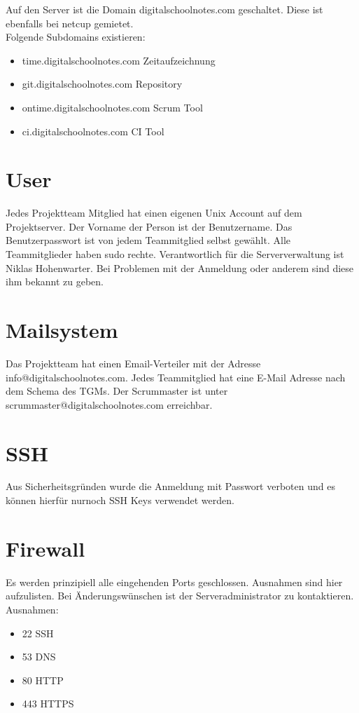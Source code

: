 \documentclass[12pt,a4paper,oneside,ngerman]{scrartcl}
\begin{document}
Auf den Server ist die Domain digitalschoolnotes.com geschaltet. Diese ist ebenfalls bei netcup gemietet.\\

Folgende Subdomains existieren:

\begin{itemize}
\item time.digitalschoolnotes.com \hfill Zeitaufzeichnung
\item git.digitalschoolnotes.com \hfill Repository
\item ontime.digitalschoolnotes.com \hfill Scrum Tool
\item ci.digitalschoolnotes.com \hfill CI Tool
\end{itemize}

\section{User}
Jedes Projektteam Mitglied hat einen eigenen Unix Account auf dem Projektserver. Der Vorname der Person ist der Benutzername. Das Benutzerpasswort ist von jedem Teammitglied selbst gewählt. Alle Teammitglieder haben sudo rechte. Verantwortlich für die Serververwaltung ist Niklas Hohenwarter. Bei Problemen mit der Anmeldung oder anderem sind diese ihm bekannt zu geben.

\section{Mailsystem}
Das Projektteam hat einen Email-Verteiler mit der Adresse info@digitalschoolnotes.com. Jedes Teammitglied hat eine E-Mail Adresse nach dem Schema des TGMs. Der Scrummaster ist unter scrummaster@digitalschoolnotes.com erreichbar.

\section{SSH}
Aus Sicherheitsgründen wurde die Anmeldung mit Passwort verboten und es können hierfür nurnoch SSH Keys verwendet werden.
\newpage

\section{Firewall}
Es werden prinzipiell alle eingehenden Ports geschlossen. Ausnahmen sind hier aufzulisten. Bei Änderungswünschen ist der Serveradministrator zu kontaktieren.\\

Ausnahmen:
\begin{itemize}
\item 22	SSH
\item 53	DNS
\item 80	HTTP
\item 443	HTTPS
\end{itemize}
\end{document}
